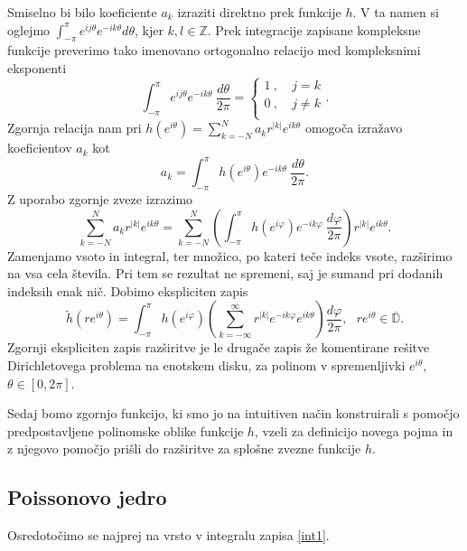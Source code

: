 \documentclass[mat1, tisk]{fmfdelo}
\begin{document}
    Smiselno bi bilo koeficiente $a_k$ izraziti direktno prek funkcije $h$. 
    V ta namen si oglejmo $\int_{-\pi}^{\pi}{e^{ij\theta} e^{-ik\theta}d\theta}$, kjer $k,l \in \mathbb{Z}$. Prek integracije zapisane kompleksne funkcije preverimo tako imenovano ortogonalno relacijo med kompleksnimi eksponenti
        $$
        \int_{-\pi}^{\pi}{e^{ij\theta} e^{-ik\theta}~\frac{d\theta}{2\pi}} = 
        \begin{cases}
            1~,~&j=k\\
            0~,~&j \neq k\\
        \end{cases}
        .$$
    Zgornja relacija nam pri $h(e^{i\theta}) = \sum_{k = -N}^{N}{a_k r^{|k|} e^{ik\theta}}$ omogoča izražavo koeficientov $a_k$ kot
        $$
            a_ k = \int_{-\pi}^{\pi}{h \left(e^{i\theta}\right)e^{-ik\theta}~\frac{d\theta}{2\pi}}.
        $$
    Z uporabo zgornje zveze izrazimo
    $$
        \sum_{k = - N}^{N}{ a_k r^{|k|}e^{ik\theta}} = \sum_{k = - N}^{N} \left(\int_{-\pi}^{\pi}{h(e^{i \varphi}) e^{- i k \varphi}~\frac{d \varphi}{2 \pi}}\right) r^{|k|} e^{i k \theta}.
    $$
    Zamenjamo vsoto in integral, ter množico, po kateri teče indeks vsote, razširimo na vsa cela števila. Pri tem se rezultat ne spremeni, saj je sumand pri dodanih indeksih enak nič. Dobimo ekspliciten zapis
    \begin{equation}
        \label{int1}
        \widetilde{h}(r e^{i \theta}) = \int_{-\pi}^{\pi}{h(e^{i \varphi}) \left(\sum_{k = - \infty}^{\infty} r^{|k|} e^{- i k \varphi} e^{i k \theta} \right) \frac{d \varphi}{2 \pi}}, ~~~ r e^{i\theta} \in \overline{\mathbb{D}}.
    \end{equation}
    Zgornji ekspliciten zapis razširitve je le drugače zapis že komentirane rešitve Dirichletovega problema na enotskem disku, za polinom v spremenljivki $e^{i \theta}$, \mbox{$\theta \in [0,2\pi]$}.
    
    Sedaj bomo zgornjo funkcijo, ki smo jo na intuitiven način konstruirali s pomočjo predpostavljene polinomske oblike funkcije $h$, vzeli za definicijo novega pojma in z njegovo pomočjo prišli do razširitve za splošne zvezne funkcije $h$.
    
\subsection{Poissonovo jedro}

    Osredotočimo se najprej na vrsto v integralu zapisa \eqref{int1}.
\end{document}
